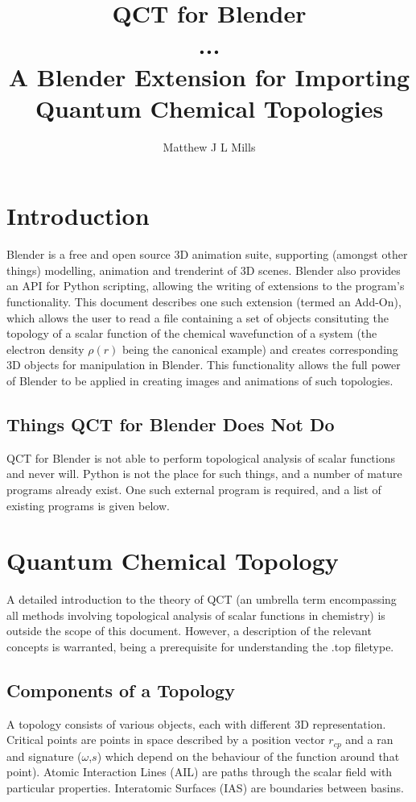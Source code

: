 \documentclass{report}
\title{QCT for Blender \\
       \large ... \\ 
       A Blender Extension for Importing Quantum Chemical Topologies}
\author{Matthew J L Mills}
\begin{document}
\maketitle

\chapter{Introduction}

Blender is a free and open source 3D animation suite, supporting (amongst other things) modelling, animation and trenderint of 3D scenes. 
Blender also provides an API for Python scripting, allowing the writing of extensions to the program's functionality.
This document describes one such extension (termed an Add-On), which allows the user to read a file containing a set of objects consituting the topology of a scalar function of the chemical wavefunction of a system (the electron density $\rho(r)$ being the canonical example) and creates corresponding 3D objects for manipulation in Blender.
This functionality allows the full power of Blender to be applied in creating images and animations of such topologies.


\section{Things QCT for Blender Does Not Do}

QCT for Blender is not able to perform topological analysis of scalar functions and never will.
Python is not the place for such things, and a number of mature programs already exist.
One such external program is required, and a list of existing programs is given below.

\chapter{Quantum Chemical Topology}

A detailed introduction to the theory of QCT (an umbrella term encompassing all methods involving topological analysis of scalar functions in chemistry) is outside the scope of this document.
However, a description of the relevant concepts is warranted, being a prerequisite for understanding the .top filetype.

\section{Components of a Topology}

A topology consists of various objects, each with different 3D representation. 
Critical points are points in space described by a position vector $r_{cp}$ and a ran and signature ($\omega$,$s$) which depend on the behaviour of the function around that point).
Atomic Interaction Lines (AIL) are paths through the scalar field with particular properties.
Interatomic Surfaces (IAS) are boundaries between basins.
\end{document}
